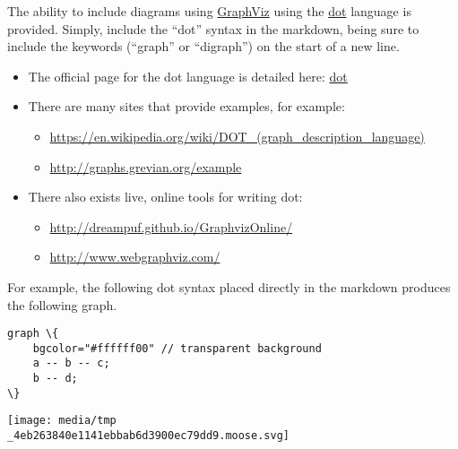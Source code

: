 \documentclass[]{report}
\begin{document}
\par
The ability to include diagrams using \href{http://www.graphviz.org/}{GraphViz} using the \href{}{dot} language is provided.
Simply, include the ``dot'' syntax in the markdown, being sure to include the keywords (``graph'' or
``digraph'') on the start of a new line.\begin{itemize}
\item The official page for the dot language is detailed here: \href{http://www.graphviz.org/content/dot-language}{dot}
\item There are many sites that provide examples, for example:\begin{itemize}
\item \href{https://en.wikipedia.org/wiki/DOT\_(graph\_description\_language)}{https://en.wikipedia.org/wiki/DOT\_(graph\_description\_language)}
\item \href{http://graphs.grevian.org/example}{http://graphs.grevian.org/example}
\end{itemize}
\item There also exists live, online tools for writing dot:\begin{itemize}
\item \href{http://dreampuf.github.io/GraphvizOnline/}{http://dreampuf.github.io/GraphvizOnline/}
\item \href{http://www.webgraphviz.com/}{http://www.webgraphviz.com/}
\end{itemize}
\end{itemize}
\par
For example, the following dot syntax placed directly in the markdown produces the following graph.\begin{lstlisting}
graph \{
    bgcolor="#ffffff00" // transparent background
    a -- b -- c;
    b -- d;
\}
\end{lstlisting}\texttt{[image: media/tmp\\\_4eb263840e1141ebbab6d3900ec79dd9.moose.svg]}
\end{document}
